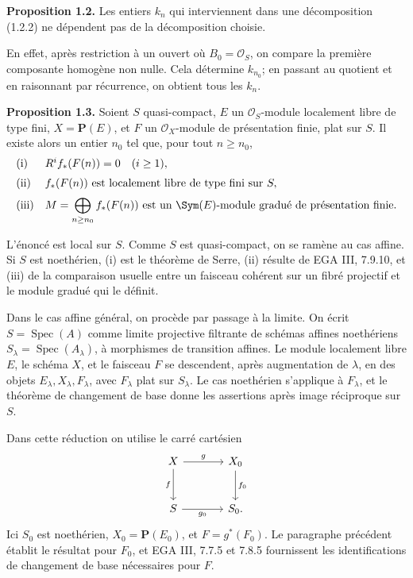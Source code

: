 \documentclass[11pt]{article}
\newcommand{\Spec}{\operatorname{Spec}}
\begin{document}
\textbf{Proposition 1.2.} Les entiers \(k_n\) qui interviennent dans une décomposition (1.2.2) ne dépendent pas de la décomposition choisie.

En effet, après restriction à un ouvert où \(B_0=\mathcal O_S\), on compare la première composante homogène non nulle. Cela détermine \(k_{n_0}\); en passant au quotient et en raisonnant par récurrence, on obtient tous les \(k_n\).

\textbf{Proposition 1.3.} Soient \(S\) quasi-compact, \(E\) un \(\mathcal O_S\)-module localement libre de type fini, \(X=\mathbf P(E)\), et \(F\) un \(\mathcal O_X\)-module de présentation finie, plat sur \(S\). Il existe alors un entier \(n_0\) tel que, pour tout \(n\geq n_0\),
\[
\begin{array}{ll}
\text{\rm (i)}& R^i f_*(F(n))=0\quad (i\geq 1),\\[2mm]
\text{\rm (ii)}& f_*(F(n))\text{ est localement libre de type fini sur }S,\\[2mm]
\text{\rm (iii)}& \displaystyle M=\bigoplus_{n\geq n_0} f_*(F(n))
\text{ est un }\Sym(E)\text{-module gradué de présentation finie.}
\end{array}
\]

L'énoncé est local sur \(S\). Comme \(S\) est quasi-compact, on se ramène au cas affine. Si \(S\) est noethérien, (i) est le théorème de Serre, (ii) résulte de EGA III, 7.9.10, et (iii) de la comparaison usuelle entre un faisceau cohérent sur un fibré projectif et le module gradué qui le définit.

Dans le cas affine général, on procède par passage à la limite. On écrit \(S=\Spec(A)\) comme limite projective filtrante de schémas affines noethériens \(S_\lambda=\Spec(A_\lambda)\), à morphismes de transition affines. Le module localement libre \(E\), le schéma \(X\), et le faisceau \(F\) se descendent, après augmentation de \(\lambda\), en des objets \(E_\lambda,X_\lambda,F_\lambda\), avec \(F_\lambda\) plat sur \(S_\lambda\). Le cas noethérien s'applique à \(F_\lambda\), et le théorème de changement de base donne les assertions après image réciproque sur \(S\).

Dans cette réduction on utilise le carré cartésien
\[
\begin{tikzcd}[column sep=large,row sep=large]
X \arrow[r,"g"] \arrow[d,"f"'] & X_0 \arrow[d,"f_0"]\\
S \arrow[r,"g_0"'] & S_0 .
\end{tikzcd}
\]
Ici \(S_0\) est noethérien, \(X_0=\mathbf P(E_0)\), et \(F=g^*(F_0)\). Le paragraphe précédent établit le résultat pour \(F_0\), et EGA III, 7.7.5 et 7.8.5 fournissent les identifications de changement de base nécessaires pour \(F\).
\end{document}
